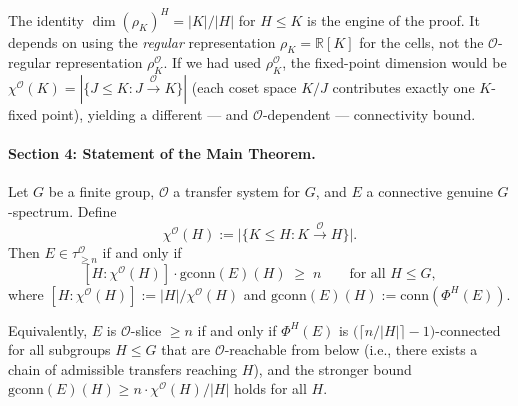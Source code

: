 \begin{remark}\label{rem:p5-crucial}
The identity $\dim(\rho_K)^H = |K|/|H|$ for $H \leq K$ is the engine
of the proof. It depends on using the \emph{regular} representation
$\rho_K = \mathbb{R}[K]$ for the cells, not the $\mathcal{O}$-regular
representation $\rho_K^{\mathcal{O}}$. If we had used $\rho_K^{\mathcal{O}}$,
the fixed-point dimension would be
$\chi^{\mathcal{O}}(K) = |\{J \leq K : J \xrightarrow{\mathcal{O}} K\}|$
(each coset space $K/J$ contributes exactly one $K$-fixed point), yielding
a different --- and $\mathcal{O}$-dependent --- connectivity bound.
\end{remark}


\paragraph{Section 4: Statement of the Main Theorem.}

\begin{theorem}
\label{thm:p5-main}
Let $G$ be a finite group, $\mathcal{O}$ a transfer system for $G$, and
$E$ a connective genuine $G$-spectrum. Define
\[
  \chi^{\mathcal{O}}(H) := \bigl|\{K \leq H : K \xrightarrow{\mathcal{O}} H\}\bigr|.
\]
Then $E \in \tau_{\geq n}^{\mathcal{O}}$ if and only if
\begin{equation}\label{eq:p5-main}
  [H : \chi^{\mathcal{O}}(H)] \cdot \mathrm{gconn}(E)(H) \;\geq\; n
  \qquad\text{for all } H \leq G,
\end{equation}
where $[H : \chi^{\mathcal{O}}(H)] := |H|/\chi^{\mathcal{O}}(H)$ and
$\mathrm{gconn}(E)(H) := \mathrm{conn}(\Phi^H(E))$.

Equivalently, $E$ is $\mathcal{O}$-slice $\geq n$ if and only if
$\Phi^H(E)$ is $\bigl(\lceil n/|H| \rceil - 1\bigr)$-connected for
all subgroups $H \leq G$ that are $\mathcal{O}$-reachable from below
(i.e., there exists a chain of admissible transfers reaching $H$), and
the stronger bound $\mathrm{gconn}(E)(H) \geq n \cdot \chi^{\mathcal{O}}(H)/|H|$
holds for all $H$.
\end{theorem}

